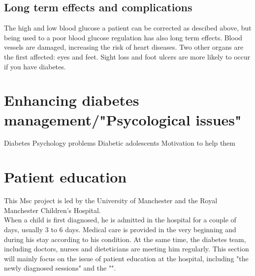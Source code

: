 \subsection{Long term effects and complications}
The high and low blood glucose a patient can be corrected as descibed above, but being used to a poor blood glucose regulation has also long term effects. Blood vessels are damaged, increasing the risk of heart diseases. Two other organs are the first affected: eyes and feet. Sight loss and foot ulcers are more likely to occur if you have diabetes.  
\section{Enhancing diabetes management/"Psycological issues"}

Diabetes Psychology problems
Diabetic adolescents
Motivation to help them 

\section{Patient education}
This Msc project is led by the University of Manchester and the Royal Manchester Children’s Hospital. 
\\When a child is first diagnosed, he is admitted in the hospital for a couple of days, usually 3 to 6 days. Medical care is provided in the very beginning and during his stay according to his condition. At the same time, the diabetes team, including doctors, nurses and dieteticians are meeting him regularly. This section will mainly focus on the issue of patient education at the hospital, including "the newly diagnosed sessions" and the "".
\\

